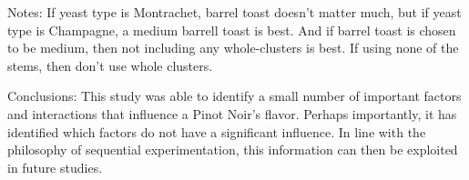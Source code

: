 \documentclass[]{article}
\begin{document}
Notes: If yeast type is Montrachet, barrel toast doesn't matter much,
but if yeast type is Champagne, a medium barrell toast is best. And if
barrel toast is chosen to be medium, then not including any
whole-clusters is best. If using none of the stems, then don't use whole
clusters.

Conclusions: This study was able to identify a small number of important
factors and interactions that influence a Pinot Noir's flavor. Perhaps
importantly, it has identified which factors do not have a significant
influence. In line with the philosophy of sequential experimentation,
this information can then be exploited in future studies.
\end{document}
